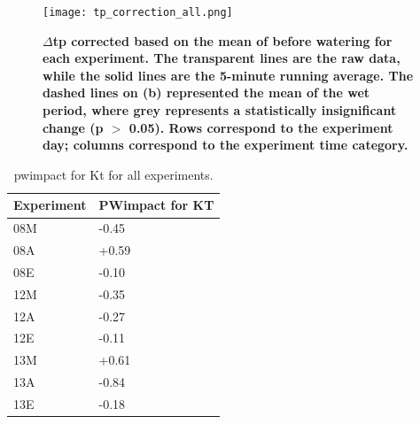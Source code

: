 \documentclass[final,3p,times,authoryear]{elsarticle}
\begin{document}

\begin{figure}
\centering
\texttt{[image: tp\_correction\_all.png]}
\caption{\bf $\Delta$\gls{tp} corrected based on the mean of before watering for each experiment. The transparent lines are the raw data, while the solid lines are the 5-minute running average. The dashed lines on (b) represented the mean of the wet period, where grey represents a statistically insignificant change (\gls{p} $>$ 0.05). Rows correspond to the experiment day; columns correspond to the experiment time category.}
 \label{fig:7.14}
\end{figure}



\begin{table}[!ht]\caption{\gls{pwimpact} for \gls{Kt} for all experiments.}
    \centering
    \begin{tabular}{|l|l|}
    \hline
        Experiment & PWimpact for KT \\ \hline
        08M & -0.45 \\ \hline
        08A & +0.59 \\ \hline
        08E & -0.10 \\ \hline
        12M & -0.35 \\ \hline
        12A & -0.27 \\ \hline
        12E & -0.11 \\ \hline
        13M & +0.61 \\ \hline
        13A & -0.84 \\ \hline
        13E & -0.18 \\ \hline
    \end{tabular}\label{table:7.4}
\end{table}


\end{document}
